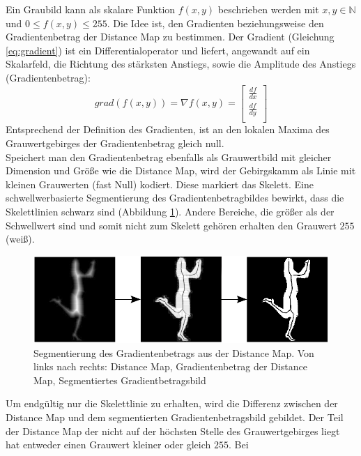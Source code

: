 Ein Graubild kann als skalare Funktion $f(x,y)$ beschrieben werden mit $x,y \in \mathbb{N}$ und
$0 \leq f(x,y) \leq 255$. 
Die Idee ist, den Gradienten beziehungsweise den Gradientenbetrag der Distance Map zu bestimmen. Der Gradient (Gleichung \ref{eq:gradient}) ist ein Differentialoperator und liefert, angewandt auf ein Skalarfeld, die Richtung des stärksten Anstiegs, sowie die Amplitude des Anstiegs (Gradientenbetrag):
\begin{equation}
\label{eq:gradient}
   grad(f(x,y)) = \nabla f(x,y) = \begin{bmatrix}
         \frac{df}{dx}        \\[0.3em]
         \frac{df}{dy} \\[0.3em]
      \end{bmatrix}
\end{equation}
Entsprechend der Definition des Gradienten, ist an den lokalen Maxima des Grauwertgebirges der Gradientenbetrag gleich null.\\
Speichert man den Gradientenbetrag ebenfalls als Grauwertbild mit gleicher Dimension und Größe wie die Distance Map, wird der Gebirgskamm als Linie mit kleinen Grauwerten (fast Null) kodiert. Diese markiert das Skelett. Eine schwellwerbasierte Segmentierung des Gradientenbetragbildes bewirkt, dass die Skelettlinien schwarz sind (Abbildung \ref{fig:bildung_gradient}). Andere Bereiche, die größer als der Schwellwert sind und somit nicht zum Skelett gehören erhalten den Grauwert $255$ (weiß). 
\begin{figure}
\centering
\includegraphics[width=1.0\linewidth]{./fig/bildung_gradient}
\caption{Segmentierung des Gradientenbetrags aus der Distance Map. Von links nach rechts: Distance Map, Gradientenbetrag der Distance Map, Segmentiertes Gradientbetragsbild}
\label{fig:bildung_gradient}
\end{figure}
\FloatBarrier
\noindent
Um endgültig nur die Skelettlinie zu erhalten, wird die Differenz
zwischen der Distance Map und dem segmentierten Gradientenbetragsbild gebildet. Der Teil der Distance Map der nicht
auf der höchsten Stelle des Grauwertgebirges liegt hat entweder einen Grauwert kleiner oder gleich $255$. Bei

